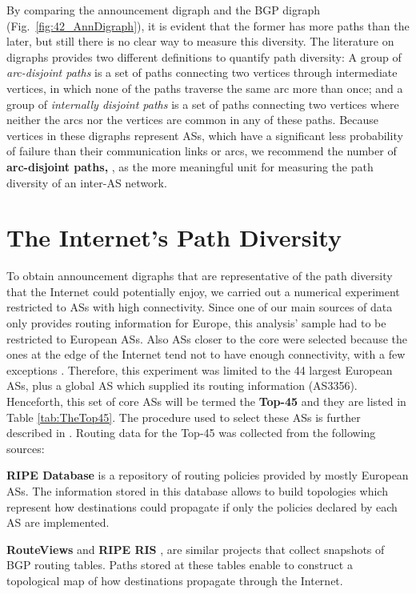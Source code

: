 \documentclass[10pt,final,journal]{IEEEtran}
\begin{document}
By comparing the announcement digraph and the BGP digraph (Fig.~\ref{fig:42_AnnDigraph}), it is evident that the former has more paths than the later, but still there is no clear way to measure this diversity. The literature on digraphs \cite{Bang-Jensen2002} provides two different definitions to quantify path diversity: A group of \emph{arc-disjoint paths} is a set of paths connecting two vertices through intermediate vertices, in which none of the paths traverse the same arc more than once; and a group of \emph{internally disjoint paths} is a set of paths connecting two vertices where neither the arcs nor the vertices are common in any of these paths. Because vertices in these digraphs represent ASs, which have a significant less probability of failure than their communication links or arcs, we recommend the number of \textbf{arc-disjoint paths, }, as the more meaningful unit for measuring the path diversity of an inter-AS network.



\section{The Internet's Path Diversity}\label{internet_path_div}

To obtain announcement digraphs that are representative of the path diversity that the Internet could potentially enjoy, we carried out a numerical experiment restricted to ASs with high connectivity. Since one of our main sources of data only provides routing information for Europe, this analysis' sample had to be restricted to European ASs. Also ASs closer to the core were selected because the ones at the edge of the Internet tend not to have enough connectivity, with a few exceptions \cite{Oliveira2008}. Therefore, this experiment was limited to the 44 largest European ASs, plus a global AS which supplied its routing information (AS3356). Henceforth, this set of core ASs will be termed the \textbf{Top-45} and they are listed in Table \ref{tab:TheTop45}. The procedure used to select these ASs is further described in \cite{Arjona-Villicana2009}. Routing data for the Top-45 was collected from the following sources:

\textbf{RIPE Database} \cite{RIPEDatabase} is a repository of routing policies provided by mostly European ASs. The information stored in this database allows to build topologies which represent how destinations could propagate if only the policies declared by each AS are implemented.

\textbf{RouteViews} \cite{Routeviews} and \textbf{RIPE RIS} \cite{RIPERIS}, are similar projects that collect snapshots of BGP routing tables. Paths stored at these tables enable to construct a topological map of how destinations propagate through the Internet.
\end{document}
